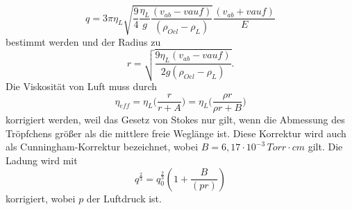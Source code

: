 \begin{equation}
   q = 3 \pi \eta_L \sqrt{\frac{9}{4} \frac{\eta_L}{g} \frac{(v_{ab}-v{auf})}{(\rho_{Oel}-\rho_L)}} \frac{(v_{ab}+v{auf})}{E}
    \label{eqn:Ladung}
\end{equation}
bestimmt werden und der Radius zu
\begin{equation}
    r = \sqrt{\frac{9 \eta_L (v_{ab}-v{auf})}{2 g (\rho_{Oel}-\rho_L)}}.
    \label{eqn:Radius}
\end{equation}
Die Viskosität von Luft muss durch 
\begin{equation}
    \eta_{eff} = \eta_L \Biggl(\frac{r}{r + A}\Biggr) = \eta_L \Biggl(\frac{\rho r}{\rho r + B}\Biggr)
    \label{eqn:eta_kor}
\end{equation}
korrigiert werden, weil das Gesetz von Stokes nur gilt, wenn die Abmessung des Tröpfchens größer als die mittlere
freie Weglänge ist. Diese Korrektur wird auch als Cunningham-Korrektur bezeichnet, wobei $B = 6,17 \cdot 10^{-3}\,  Torr \cdot cm$ gilt.
Die Ladung wird mit 
\begin{equation}
    q^{\frac{2}{3}} = q^{\frac{2}{3}}_0 (1 + \frac{B}{(p r)})
    \label{eqn:Ladung_kor}
\end{equation}
korrigiert, wobei $p$ der Luftdruck ist.